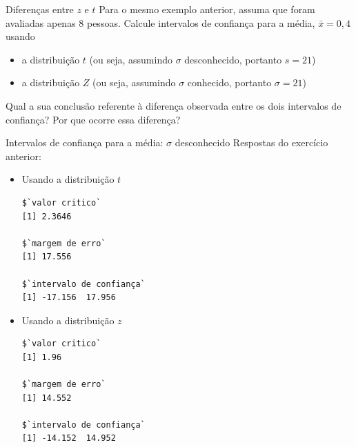\documentclass[10pt]{beamer}\usepackage[]{graphicx}\usepackage[]{color}
\makeatletter
\newenvironment{kframe}{%
 \def\at@end@of@kframe{}%
 \ifinner\ifhmode%
  \def\at@end@of@kframe{\end{minipage}}%
  \begin{minipage}{\columnwidth}%
 \fi\fi%
 \def\FrameCommand##1{\hskip\@totalleftmargin \hskip-\fboxsep
 \colorbox{shadecolor}{##1}\hskip-\fboxsep
     \hskip-\linewidth \hskip-\@totalleftmargin \hskip\columnwidth}%
 \MakeFramed {\advance\hsize-\width
   \@totalleftmargin\z@ \linewidth\hsize
   \@setminipage}}%
 {\par\unskip\endMakeFramed%
 \at@end@of@kframe}
\newenvironment{knitrout}{}{} %
\theoremstyle{definition}
\makeatother
\begin{document}
\begin{frame}{Diferenças entre $z$ e $t$}
  Para o mesmo exemplo anterior, assuma que foram avaliadas apenas 8
  pessoas. Calcule intervalos de confiança para a média, $\bar{x} = 0,4$
  usando
  \begin{itemize}
  \item a distribuição $t$ (ou seja, assumindo $\sigma$ desconhecido,
  portanto $s = 21$)
\item a distribuição $Z$ (ou seja, assumindo $\sigma$ conhecido,
  portanto $\sigma = 21$)
  \end{itemize}
  Qual a sua conclusão referente à diferença observada entre os dois
  intervalos de confiança? Por que ocorre essa diferença?
\end{frame}

\begin{frame}[fragile]{Intervalos de confiança para a média: $\sigma$ desconhecido}
Respostas do exercício anterior:
\begin{itemize}
\item Usando a distribuição $t$
\begin{knitrout}\footnotesize
{}\color{fgcolor}\begin{kframe}
\begin{verbatim}
$`valor critico`
[1] 2.3646

$`margem de erro`
[1] 17.556

$`intervalo de confiança`
[1] -17.156  17.956
\end{verbatim}
\end{kframe}
\end{knitrout}
\item Usando a distribuição $z$
\begin{knitrout}\footnotesize
{}\color{fgcolor}\begin{kframe}
\begin{verbatim}
$`valor critico`
[1] 1.96

$`margem de erro`
[1] 14.552

$`intervalo de confiança`
[1] -14.152  14.952
\end{verbatim}
\end{kframe}
\end{knitrout}
\end{itemize}
\end{frame}
\end{document}

